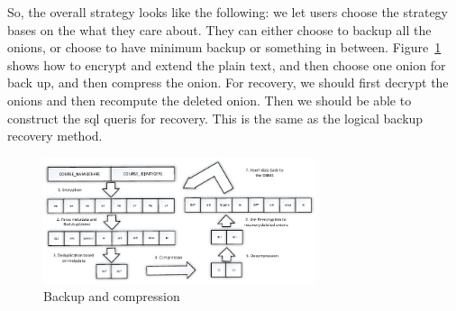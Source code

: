 So, the overall strategy looks like the following: we let users choose the strategy bases on the what they care about. They can either choose to backup all the onions, or choose to have minimum backup or something in between. Figure~\ref{fig:stack7} shows how to encrypt and extend the plain text, and then choose one onion for back up, and then compress the onion. For recovery, we should first decrypt the onions and then recompute the deleted onion. Then we should be able to construct the sql queris for recovery. This is the same as the logical backup recovery method.

\begin{figure}[tb]
\centering
\includegraphics[width=8cm]{images/backup_and_recovery.pdf}
\caption{Backup and compression}
\label{fig:stack7}
\end{figure}



